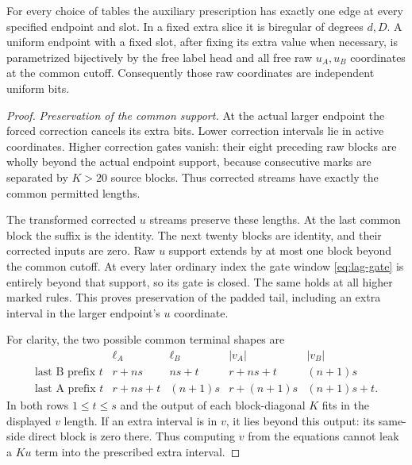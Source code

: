 \begin{lemma}\label{lem:incidence-inversion}
For every choice of tables the auxiliary prescription has exactly one
edge at every specified endpoint and slot.  In a fixed extra slice it is
biregular of degrees $d,D$.  A uniform endpoint with a fixed slot, after
fixing its extra value when necessary, is parametrized bijectively by
the free label head and all free raw $u_A,u_B$ coordinates at the common
cutoff.  Consequently those raw coordinates are independent uniform bits.
\end{lemma}

\begin{proof}
\emph{Preservation of the common support.}
At the actual larger endpoint the forced correction cancels its extra
bits.  Lower correction intervals lie in active coordinates.  Higher
correction gates vanish: their eight preceding raw blocks are wholly
beyond the actual endpoint support, because consecutive marks are
separated by $K>20$ source blocks.  Thus corrected streams have exactly
the common permitted lengths.

The transformed corrected $u$ streams preserve these lengths.  At the
last common block the suffix is the identity.  The next twenty blocks
are identity, and their corrected inputs are zero.  Raw $u$ support
extends by at most one block beyond the common cutoff.  At every later
ordinary index the gate window \eqref{eq:lag-gate} is entirely beyond
that support, so its gate is closed.  The same holds at all higher
marked rules.  This proves preservation of the padded tail, including
an extra interval in the larger endpoint's $u$ coordinate.

For clarity, the two possible common terminal shapes are
\begin{equation}\label{eq:terminal-shapes}
\begin{array}{c|cccc}
 &\ell_A&\ell_B&|v_A|&|v_B|\\ \hline
 \text{last B prefix }t&r+ns&ns+t&r+ns+t&(n+1)s\\
 \text{last A prefix }t&r+ns+t&(n+1)s&r+(n+1)s&(n+1)s+t .
\end{array}
\end{equation}
In both rows $1\le t\le s$ and the output of each block-diagonal $K$
fits in the displayed $v$ length.  If an extra interval is in $v$, it
lies beyond this output: its same-side direct block is zero there.
Thus computing $v$ from the equations cannot leak a $K u$ term into
the prescribed extra interval.


\end{proof}
